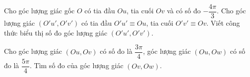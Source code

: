 \begin{bt}%
	Cho góc lượng giác gốc $O$ có tia đầu $Ou$, tia cuối $Ov$ và có số đo $-\dfrac{4\pi}{3}$. Cho góc lượng giác $(O'u',O'v')$ có tia đầu $O'u'\equiv Ou$, tia cuối $O'v'\equiv Ov$. Viết công thức biểu thị số đo góc lượng giác $(O'u',O'v')$.
\end{bt}

\begin{bt}%
	Cho góc lượng giác $(Ou,Ov)$ có số đo là $\dfrac{3\pi}{4}$, góc lượng giác $(Ou,Ow)$ có số đo là $\dfrac{5\pi}{4}$. Tìm số đo của góc lượng giác $(Ov,Ow)$.
\end{bt}

